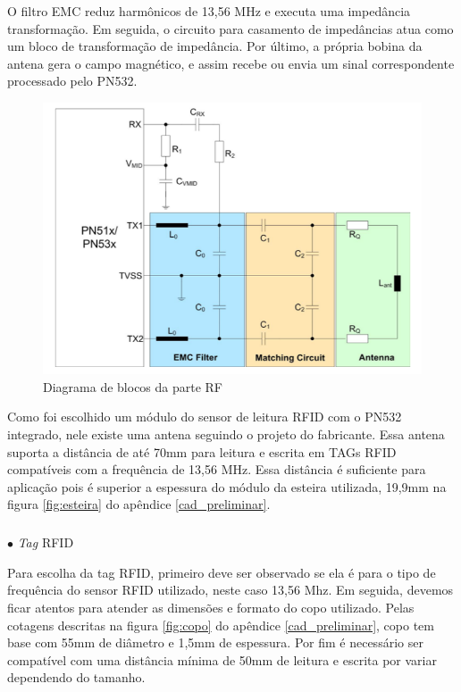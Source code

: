     O filtro EMC reduz harmônicos de 13,56 MHz e executa uma impedância transformação. Em seguida, o circuito para casamento de impedâncias atua como um bloco de transformação de impedância. Por último, a própria bobina da antena gera o campo magnético, e assim recebe ou envia um sinal  correspondente processado pelo PN532.
    
    \begin{figure}[H]
    \centering
    \includegraphics[scale=0.7]{figuras/antena_RFID.png}
    \caption{Diagrama de blocos da parte RF}
    \label{fig:antena_RFID}
    \end{figure}

   Como foi escolhido um módulo do sensor de leitura RFID com o PN532 integrado, nele existe uma antena seguindo o projeto do fabricante. Essa antena suporta a distância de até 70mm para leitura e escrita em TAGs RFID compatíveis com a frequência de 13,56 MHz. Essa distância é suficiente para aplicação pois é superior a espessura do módulo da esteira utilizada, 19,9mm na figura \ref{fig:esteira} do apêndice \ref{cad_preliminar}.
   
   \subparagraph*{} $\bullet$ \textit{Tag} RFID \hfill
   
   Para escolha da tag RFID, primeiro deve ser observado se ela é para o tipo de frequência do sensor RFID utilizado, neste caso 13,56 Mhz. Em seguida, devemos ficar atentos para atender as dimensões e formato do copo utilizado. Pelas cotagens descritas na figura \ref{fig:copo} do apêndice \ref{cad_preliminar},  copo tem base com 55mm de diâmetro e 1,5mm de espessura. Por fim é necessário ser compatível com uma distância mínima de 50mm de leitura e escrita por variar dependendo do tamanho.
   
